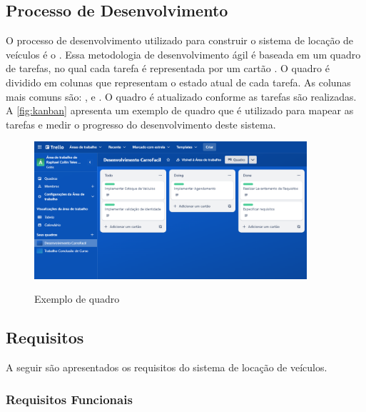 \subsection{Processo de Desenvolvimento}
\label{section:processo_desenvolvimento}
O processo de desenvolvimento utilizado para construir o sistema de locação de veículos é o . Essa metodologia de desenvolvimento ágil é baseada em um quadro de tarefas, no qual cada tarefa é representada por um cartão \cite{gomes2014agile}. O quadro é dividido em colunas que representam o estado atual de cada tarefa. As colunas mais comuns são: ,  e . O quadro é atualizado conforme as tarefas são realizadas. A \autoref{fig:kanban} apresenta um exemplo de quadro  que é utilizado para mapear as tarefas e medir o progresso do desenvolvimento deste sistema.

\begin{figure}[ht!]
    \centering
    \caption{Exemplo de quadro }
    \includegraphics[width=0.9\textwidth]{media/kanban.png}
    \label{fig:kanban}
\end{figure}

\subsection{Requisitos}
A seguir são apresentados os requisitos do sistema de locação de veículos.
\subsubsection{Requisitos Funcionais}

